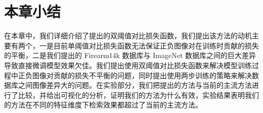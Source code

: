\section{本章小结}\label{sec:double_margin_conclusion}
在本章中，我们详细介绍了提出的双阈值对比损失函数，我们提出该方法的动机主要有两个，一是目前单阈值对比损失函数无法保证正负图像对在训练时贡献的损失的平衡，二是我们提出的 Firearm14k 数据库与 ImageNet 数据库之间的巨大差异导致直接微调模型效果欠佳。我们提出使用双阈值对比损失函数来解决模型训练过程中正负图像对贡献的损失不平衡的问题，同时提出使用两步训练的策略来解决数据库之间图像差异大的问题。在实验部分，我们把提出的方法与当前的主流方法进行了比较，并给出可视化的分析，证明我们的方法为什么有效，实验结果表明我们的方法在不同的特征维度下检索效果都超过了当前的主流方法。
